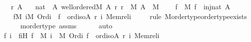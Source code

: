 \begin{isabellebody}
\ \ \ r\ A\isanewline
\ \ \ {\isachardoublequoteopen}nat\ {\isasymlesssim}\ A{\isachardoublequoteclose}\ {\isachardoublequoteopen}wellordered{\isacharparenleft}{\kern0pt}{\isacharhash}{\kern0pt}{\isacharhash}{\kern0pt}M{\isacharcomma}{\kern0pt}\ A{\isacharcomma}{\kern0pt}\ r{\isacharparenright}{\kern0pt}{\isachardoublequoteclose}\ {\isachardoublequoteopen}r\ {\isasymin}\ M{\isachardoublequoteclose}\ {\isachardoublequoteopen}A\ {\isasymin}\ M{\isachardoublequoteclose}\ \isanewline
\ \ \ {\isachardoublequoteopen}{\isasymexists}f\ {\isasymin}\ M{\isachardot}{\kern0pt}\ f\ {\isasymin}\ inj{\isacharparenleft}{\kern0pt}nat{\isacharcomma}{\kern0pt}\ A{\isacharparenright}{\kern0pt}{\isachardoublequoteclose}\ \isanewline
%
\isadelimproof
%
\endisadelimproof
%
\isatagproof
{}\isamarkupfalse%
\ {\isacharminus}{\kern0pt}\ \isanewline
\ \ \isamarkupfalse%
\ {\isachardoublequoteopen}{\isasymexists}f{\isacharbrackleft}{\kern0pt}{\isacharhash}{\kern0pt}{\isacharhash}{\kern0pt}M{\isacharbrackright}{\kern0pt}{\isachardot}{\kern0pt}\ {\isacharparenleft}{\kern0pt}{\isasymexists}i{\isacharbrackleft}{\kern0pt}{\isacharhash}{\kern0pt}{\isacharhash}{\kern0pt}M{\isacharbrackright}{\kern0pt}{\isachardot}{\kern0pt}\ Ord{\isacharparenleft}{\kern0pt}i{\isacharparenright}{\kern0pt}\ {\isasymand}\ f\ {\isasymin}\ ord{\isacharunderscore}{\kern0pt}iso{\isacharparenleft}{\kern0pt}A{\isacharcomma}{\kern0pt}\ r{\isacharcomma}{\kern0pt}\ i{\isacharcomma}{\kern0pt}\ Memrel{\isacharparenleft}{\kern0pt}i{\isacharparenright}{\kern0pt}{\isacharparenright}{\kern0pt}{\isacharparenright}{\kern0pt}{\isachardoublequoteclose}\isanewline
\ \ \ \ \isamarkupfalse%
{\isacharparenleft}{\kern0pt}rule\ M{\isacharunderscore}{\kern0pt}ordertype{\isachardot}{\kern0pt}ordertype{\isacharunderscore}{\kern0pt}exists{\isacharparenright}{\kern0pt}\isanewline
\ \ \ \ \isamarkupfalse%
\ mordertype\ assms\isanewline
\ \ \ \ \isamarkupfalse%
\ auto\isanewline
\ \ \isamarkupfalse%
\ \isamarkupfalse%
\ f\ i\ \ fiH{\isacharcolon}{\kern0pt}\ {\isachardoublequoteopen}f\ {\isasymin}\ M{\isachardoublequoteclose}\ {\isachardoublequoteopen}i\ {\isasymin}\ M{\isachardoublequoteclose}\ {\isachardoublequoteopen}Ord{\isacharparenleft}{\kern0pt}i{\isacharparenright}{\kern0pt}{\isachardoublequoteclose}\ {\isachardoublequoteopen}f\ {\isasymin}\ ord{\isacharunderscore}{\kern0pt}iso{\isacharparenleft}{\kern0pt}A{\isacharcomma}{\kern0pt}\ r{\isacharcomma}{\kern0pt}\ i{\isacharcomma}{\kern0pt}\ Memrel{\isacharparenleft}{\kern0pt}i{\isacharparenright}{\kern0pt}{\isacharparenright}{\kern0pt}{\isachardoublequoteclose}\isanewline

\end{isabellebody}
